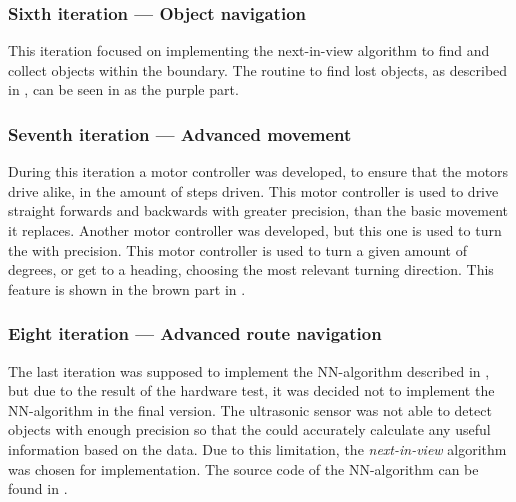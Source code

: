 \subsubsection{Sixth iteration --- Object navigation}
This iteration focused on implementing the next-in-view algorithm to find and collect objects within the boundary. The routine to find lost objects, as described in , can be seen in  as the purple part.


\subsubsection{Seventh iteration --- Advanced movement}
During this iteration a motor controller was developed, to ensure that the motors drive alike, in the amount of steps driven. This motor controller is used to drive straight forwards and backwards with greater precision, than the basic movement it replaces. Another motor controller was developed, but this one is used to turn the \projname{} with precision. This motor controller is used to turn a given amount of degrees, or get to a heading, choosing the most relevant turning direction. This feature is shown in the brown part in .


\subsubsection{Eight iteration --- Advanced route navigation}
The last iteration was supposed to implement the NN-algorithm described in , but due to the result of the hardware test, it was decided not to implement the NN-algorithm in the final version. The ultrasonic sensor was not able to detect objects with enough precision so that the \projname{} could accurately calculate any useful information based on the data. Due to this limitation, the \emph{next-in-view} algorithm was chosen for implementation. The source code of the NN-algorithm can be found in .



